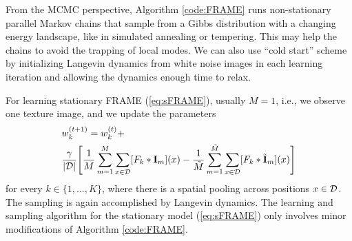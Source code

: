 \documentclass[letterpaper]{article}
\def\I{{\bf I}}
\def\tI{\tilde{\bf I}}
\begin{document}
From the MCMC perspective, Algorithm \ref{code:FRAME} runs non-stationary parallel Markov chains that sample from a Gibbs distribution with a changing energy landscape,  like in  simulated annealing or tempering. This may help the chains to avoid the trapping of local modes.  We can also use ``cold start'' scheme by initializing Langevin dynamics from white noise images in each learning iteration and allowing the dynamics enough time to relax. 

For learning stationary FRAME (\ref{eq:sFRAME}), usually $M = 1$, i.e., we observe one texture image, and we update the parameters
\begin{equation}
\begin{aligned}
&w^{(t+1)}_{k} = w^{(t)}_{k} +
 \\ & \frac{ \gamma}{|{\cal D}|} \Bigg[\frac{1}{M} \sum_{m=1}^{M} \sum_{x \in {\cal D}} [F_k *\I_m](x)
               - \frac{1}{\tilde{M}} \sum_{m=1}^{\tilde{M}} \sum_{x \in {\cal D}} [F_k *\tI_m](x)\Bigg]
\end{aligned}
\label{eq:learning1}
\end{equation}   
for every $k \in \{1, ..., K\}$, where there is a spatial pooling across positions $x \in {\cal D}$. The sampling is again accomplished by Langevin dynamics. The learning and sampling algorithm for the stationary model (\ref{eq:sFRAME}) only involves minor modifications of Algorithm \ref{code:FRAME}. 
\end{document}
